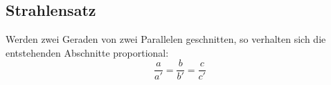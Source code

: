 \documentclass[../zusammenfassung_AN.tex]{subfiles}
\begin{document}
	
	\subsection{Strahlensatz}
	
	\begin{tcolorbox}[dglbox, title={Strahlensatz}]
		Werden zwei Geraden von zwei Parallelen geschnitten, so verhalten sich
		die entstehenden Abschnitte proportional:
		\[
		\frac{a}{a'} = \frac{b}{b'} = \frac{c}{c'}
		\]
	\end{tcolorbox}
	
	
\end{document}
